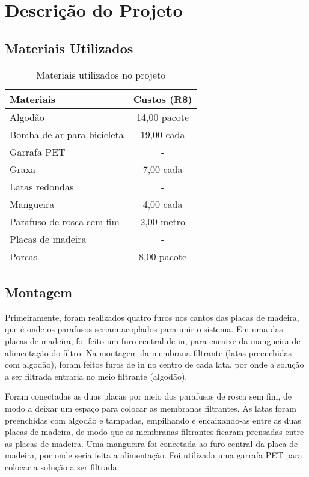 \chapter{Descrição do Projeto}\label{descricao}

\section{Materiais Utilizados}

\begin{table}[H]
\centering
\caption{Materiais utilizados no projeto}
\label{tab:materiais}
\begin{tabular}{lc}
\textbf{Materiais}         & \multicolumn{1}{l}{\textbf{Custos (R\$)}} \\ \toprule
Algodão                    &      14,00 pacote                   \\
Bomba de ar para bicicleta &      19,00 cada                     \\
Garrafa PET                & -                                   \\
Graxa                      &       7,00 cada                     \\
Latas redondas             & -                                   \\
Mangueira                  &       4,00 cada                     \\
Parafuso de rosca sem fim  &       2,00 metro                    \\
Placas de madeira          & -                                   \\
  Porcas                   &       8,00 pacote                   \\ \bottomrule
\end{tabular}
\end{table}

\section{Montagem}
\label{sec:montagem}

Primeiramente, foram realizados quatro furos nos cantos das placas de madeira,
que é onde os parafusos seriam acoplados para unir o sistema. Em uma das placas
de madeira, foi feito um furo central de  \si{in}, para encaixe
da mangueira de alimentação do filtro. Na montagem da membrana filtrante (latas
preenchidas com algodão), foram feitos furos de  \si{in} no
centro de cada lata, por onde a solução a ser filtrada entraria no meio
filtrante (algodão).

Foram conectadas as duas placas por meio dos parafusos de rosca sem fim, de modo
a deixar um espaço para colocar as membranas filtrantes. As latas foram
preenchidas com algodão e tampadas, empilhando e encaixando-as entre as duas
placas de madeira, de modo que as membranas filtrantes ficaram prensadas entre
as placas de madeira. Uma mangueira foi conectada ao furo central da placa de
madeira, por onde seria feita a alimentação. Foi utilizada uma garrafa PET para
colocar a solução a ser filtrada.



